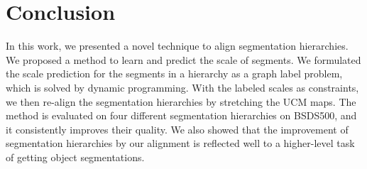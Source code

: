 \section{Conclusion}
\label{sec:conclusions}
In this work, we presented a novel technique to align segmentation
hierarchies. We proposed a method to learn and predict the scale of
segments. We formulated the scale prediction for the segments in
a hierarchy as a graph label problem, which is solved by dynamic
programming. With the labeled scales as constraints, we then re-align
the segmentation hierarchies by stretching the UCM maps. The method
is evaluated on four different segmentation hierarchies on BSDS500, and it
consistently improves their quality.  We also showed
that the improvement of segmentation hierarchies by our alignment is
reflected well to a higher-level task of getting object segmentations.
